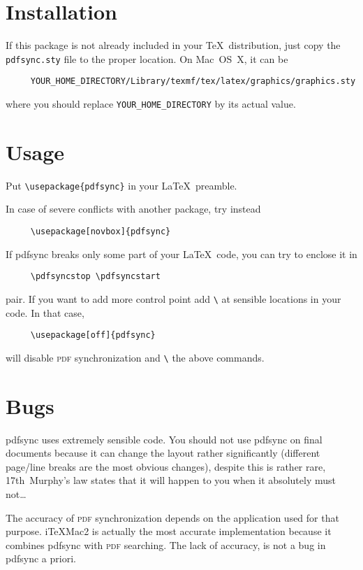 \documentclass[pagesize=auto, fontsize=12, DIV=11]{scrartcl}
\makeatletter
\newcommand*{\pkg}[1]{\textsf{#1}}
\newcommand*{\cs}[1]{\texttt{\textbackslash#1}}
\newcommand*{\cmd}[1]{\cs{\expandafter\@gobble\string#1}}
\makeatother
\begin{document}
\section{Installation}

If this package is not already included in your \TeX\ distribution,
just copy the \texttt{pdfsync.sty} file to the proper location.
On Mac~OS~X, it can be
%
\begin{verbatim}
     YOUR_HOME_DIRECTORY/Library/texmf/tex/latex/graphics/graphics.sty
\end{verbatim}
%
where you should replace \verb+YOUR_HOME_DIRECTORY+ by its actual value.


\section{Usage}

Put \verb+\usepackage{pdfsync}+ in your \LaTeX\ preamble.

In case of severe conflicts with another package, try instead
%
\begin{verbatim}
     \usepackage[novbox]{pdfsync}
\end{verbatim}

If \pkg{pdfsync} breaks only some part of your \LaTeX\ code, you can try to
enclose it in
%
\begin{verbatim}
     \pdfsyncstop \pdfsyncstart
\end{verbatim}
%
pair. If you want to add
more control point add \cmd{\pdfsync} at sensible locations in your code.
In that case,
%
\begin{verbatim}
     \usepackage[off]{pdfsync}
\end{verbatim}
%
will disable \textsc{pdf} synchronization
and \cmd{\relax} the above commands.


\section{Bugs}

\pkg{pdfsync} uses extremely sensible code.
You should not use \pkg{pdfsync} on final documents because
it can change the layout rather significantly
(different page/line breaks are the most obvious changes),
despite this is rather rare,
17th~Murphy's law states that it will happen to you when it absolutely must not\dots

The accuracy of \textsc{pdf} synchronization depends on the application used for that purpose.
i\TeX Mac2 is actually the most accurate implementation because it combines \pkg{pdfsync}
with \textsc{pdf} searching. The lack of accuracy, is not a bug in \pkg{pdfsync} a priori.
\end{document}
